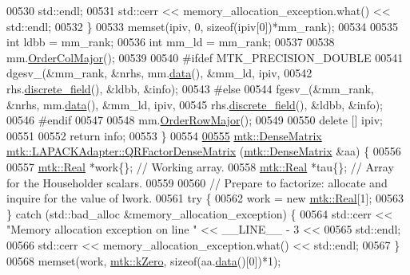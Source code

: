 \begin{DoxyCode}
00530       std::endl;
00531     std::cerr << memory\_allocation\_exception.what() << std::endl;
00532   \}
00533   memset(ipiv, 0, \textcolor{keyword}{sizeof}(ipiv[0])*mm\_rank);
00534 
00535   \textcolor{keywordtype}{int} ldbb = mm\_rank;
00536   \textcolor{keywordtype}{int} mm\_ld = mm\_rank;
00537 
00538   mm.\hyperlink{classmtk_1_1DenseMatrix_a59b9bea24acf39dca64e8549b3527463}{OrderColMajor}();
00539 
00540 \textcolor{preprocessor}{  #ifdef MTK\_PRECISION\_DOUBLE}
00541   dgesv\_(&mm\_rank, &nrhs, mm.\hyperlink{classmtk_1_1DenseMatrix_a0c33b8a9e01d157c61ddbdf807c25d84}{data}(), &mm\_ld, ipiv,
00542          rhs.\hyperlink{classmtk_1_1UniStgGrid1D_ab9c3f9ee2ac76a351b01e4abfede4d19}{discrete\_field}(), &ldbb, &info);
00543 \textcolor{preprocessor}{  #else}
00544   fgesv\_(&mm\_rank, &nrhs, mm.\hyperlink{classmtk_1_1DenseMatrix_a0c33b8a9e01d157c61ddbdf807c25d84}{data}(), &mm\_ld, ipiv,
00545          rhs.\hyperlink{classmtk_1_1UniStgGrid1D_ab9c3f9ee2ac76a351b01e4abfede4d19}{discrete\_field}(), &ldbb, &info);
00546 \textcolor{preprocessor}{  #endif}
00547 
00548   mm.\hyperlink{classmtk_1_1DenseMatrix_ac2949efba3e8278335d45418c85433e4}{OrderRowMajor}();
00549 
00550   \textcolor{keyword}{delete} [] ipiv;
00551 
00552   \textcolor{keywordflow}{return} info;
00553 \}
00554 
\hypertarget{mtk__lapack__adapter_8cc_source_l00555}{}\hyperlink{classmtk_1_1LAPACKAdapter_ae5c6e78c9c819c9ac7a6f31bfd011d7a}{00555} \hyperlink{classmtk_1_1DenseMatrix}{mtk::DenseMatrix} \hyperlink{classmtk_1_1LAPACKAdapter_ae5c6e78c9c819c9ac7a6f31bfd011d7a}{mtk::LAPACKAdapter::QRFactorDenseMatrix}
      (\hyperlink{classmtk_1_1DenseMatrix}{mtk::DenseMatrix} &aa) \{
00556 
00557   \hyperlink{group__c01-roots_gac080bbbf5cbb5502c9f00405f894857d}{mtk::Real} *work\{\}; \textcolor{comment}{// Working array.}
00558   \hyperlink{group__c01-roots_gac080bbbf5cbb5502c9f00405f894857d}{mtk::Real} *tau\{\};  \textcolor{comment}{// Array for the Householder scalars.}
00559 
00560   \textcolor{comment}{// Prepare to factorize: allocate and inquire for the value of lwork.}
00561   \textcolor{keywordflow}{try} \{
00562     work = \textcolor{keyword}{new} \hyperlink{group__c01-roots_gac080bbbf5cbb5502c9f00405f894857d}{mtk::Real}[1];
00563   \} \textcolor{keywordflow}{catch} (std::bad\_alloc &memory\_allocation\_exception) \{
00564     std::cerr << \textcolor{stringliteral}{"Memory allocation exception on line "} << \_\_LINE\_\_ - 3 <<
00565       std::endl;
00566     std::cerr << memory\_allocation\_exception.what() << std::endl;
00567   \}
00568   memset(work, \hyperlink{group__c01-roots_ga59a451a5fae30d59649bcda274fea271}{mtk::kZero}, \textcolor{keyword}{sizeof}(aa.\hyperlink{classmtk_1_1DenseMatrix_a0c33b8a9e01d157c61ddbdf807c25d84}{data}()[0])*1);

\end{DoxyCode}

